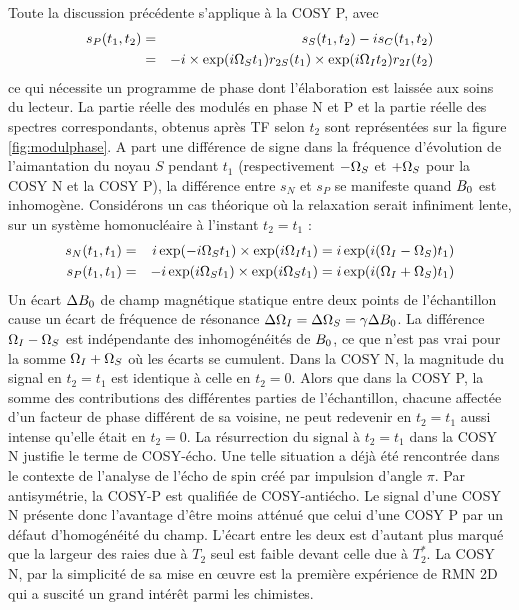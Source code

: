 Toute la discussion précédente s'applique à la COSY P, avec
\begin{eqnarray}
s_P(t_1, t_2) & = & s_S(t_1, t_2) - i s_C(t_1, t_2) \\
              & = & -i \times \exp(i \Omega_S t_1) r_{2S}(t_1) \times \exp(i \Omega_I t_2) r_{2I}(t_2)
\end{eqnarray}
ce qui nécessite un programme de phase dont l'élaboration est laissée aux soins du lecteur.
La partie réelle des {\FID} modulés en phase N et P et la partie réelle des spectres
correspondants, obtenus après TF selon $t_2$ sont représentées sur la figure \ref{fig:modulphase}.
A part une différence de signe dans la fréquence d'évolution de l'aimantation 
du noyau $S$ pendant $t_1$ (respectivement $-\Omega_S$ et $+\Omega_S$ pour la COSY N et la COSY P),
la différence entre $s_N$ et $s_P$ se manifeste quand $B_0$ est inhomogène.
Considérons un cas théorique où la relaxation serait infiniment lente, sur un système
homonucléaire à l'instant $t_2 = t_1$ :
\begin{eqnarray}
s_N(t_1, t_1) & = & i \exp(-i \Omega_S t_1) \times \exp(i \Omega_I t_1) = i \exp(i (\Omega_I-\Omega_S) t_1) \\
s_P(t_1, t_1) & = & -i \exp(i \Omega_S t_1) \times \exp(i \Omega_S t_1) = i\exp(i (\Omega_I+\Omega_S) t_1)
\end{eqnarray}
Un écart $\Delta B_0$ de champ magnétique statique entre deux points de l'échantillon
cause un écart de fréquence de résonance $\Delta\Omega_I = \Delta\Omega_S = \gamma\Delta B_0$.
La différence $\Omega_I-\Omega_S$ est indépendante des inhomogénéités de $B_0$,
ce que n'est pas vrai pour la somme $\Omega_I+\Omega_S$ où les écarts se cumulent.
Dans la COSY N, la magnitude du signal en $t_2 = t_1$ est identique à celle en $t_2 = 0$.
Alors que dans la COSY P, la somme des contributions des différentes parties de l'échantillon,
chacune affectée d'un facteur de phase différent de sa voisine, ne peut redevenir en 
$t_2 = t_1$ aussi intense qu'elle était en $t_2 = 0$.
La résurrection du signal à $t_2 = t_1$ dans la COSY N justifie le terme de COSY-écho.
Une telle situation a déjà été rencontrée dans le contexte de l'analyse de l'écho de spin
créé par impulsion d'angle $\pi$.
Par antisymétrie, la COSY-P est qualifiée de COSY-antiécho.
Le signal d'une COSY N présente donc l'avantage d'être moins atténué que celui d'une COSY P
par un défaut d'homogénéité du champ.
L'écart entre les deux est d'autant plus marqué que la largeur des raies due à $T_2$ seul
est faible devant celle due à $T_2^*$.
La COSY N, par la simplicité de sa mise en {\oe}uvre 
est la première expérience de RMN 2D
qui a suscité un grand intérêt parmi les chimistes. 

